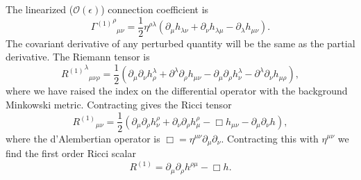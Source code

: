 \documentclass[a4paper, 11pt, titlepage, twoside]{report}
\newcommand{\order}[1]{\ensuremath{\mathcal{O}({#1})}}
\begin{document}
{The linearized ($\order{\epsilon}$) connection coefficient is
\begin{equation}
{{\Gamma^{(1)}}^\rho}_{\mu\nu} = \frac{1}{2}\eta^{\rho\lambda}(\partial_\mu h_{\lambda\nu} + \partial_\nu h_{\lambda\mu} - \partial_\lambda h_{\mu\nu}).
\label{eq:Lin_Gamma}
\end{equation}
The covariant derivative of any perturbed quantity will be the same as the partial derivative. The Riemann tensor is
\begin{equation}
{{R^{(1)}}^\lambda}_{\mu\nu\rho} = \frac{1}{2}(\partial_\mu\partial_\nu h^\lambda_\rho + \partial^\lambda\partial_\rho h_{\mu\nu} - \partial_\mu\partial_\rho h^\lambda_\nu - \partial^\lambda\partial_\nu h_{\mu\rho}),
\label{eq:Lin_Riemann}
\end{equation}
where we have raised the index on the differential operator with the background Minkowski metric. Contracting gives the Ricci tensor
\begin{equation}
{R^{(1)}}_{\mu\nu} = \frac{1}{2}(\partial_\mu\partial_\rho h^\rho_\nu + \partial_\nu\partial_\rho h^\rho_\mu -\Box h_{\mu\nu} - \partial_\mu\partial_\nu h),
\label{eq:Ricci}
\end{equation}
where the d'Alembertian operator is $\Box = \eta^{\mu\nu}\partial_\mu\partial_\nu$. Contracting this with $\eta^{\mu\nu}$ we find the first order Ricci scalar
\begin{equation}
R^{(1)} = \partial_\mu\partial_\rho h^{\rho\mu} - \Box h.
\label{eq:Scalar}
\end{equation}

}
\end{document}
